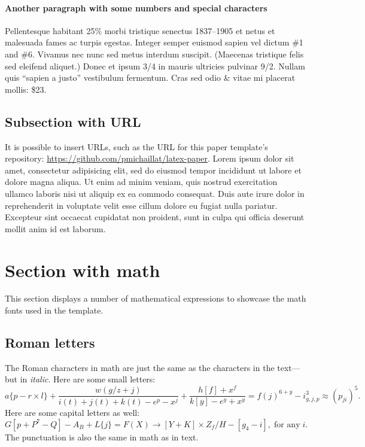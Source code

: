 \documentclass[letterpaper,11pt,leqno]{article}
\begin{document}
\paragraph{Another paragraph with some numbers and special characters} Pellentesque habitant 25\% morbi tristique senectus 1837--1905 et netus et malesuada fames ac turpis egestas. Integer semper euismod sapien vel dictum \#1 and \#6. Vivamus nec nunc sed metus interdum suscipit. (Maecenas tristique felis sed eleifend aliquet.) Donec et ipsum 3/4 in mauris ultricies pulvinar 9/2. Nullam quis ``sapien a justo'' vestibulum fermentum. Cras sed odio \& vitae mi placerat mollis: \$23.

\subsection{Subsection with URL}

It is possible to insert URLs, such as the URL for this paper template's repository: \url{https://github.com/pmichaillat/latex-paper}. Lorem ipsum dolor sit amet, consectetur adipisicing elit, sed do eiusmod tempor incididunt ut labore et dolore magna aliqua. Ut enim ad minim veniam, quis nostrud exercitation ullamco laboris nisi ut aliquip ex ea commodo consequat. Duis aute irure dolor in reprehenderit in voluptate velit esse
cillum dolore eu fugiat nulla pariatur. Excepteur sint occaecat cupidatat non
proident, sunt in culpa qui officia deserunt mollit anim id est laborum.

\section{Section with math}\label{s:math}

This section displays a number of mathematical expressions to showcase the math fonts used in the template.

\subsection{Roman letters} 

The Roman characters in math are just the same as the characters in the text---but in \textit{italic}. Here are some small letters: 
\begin{equation*}
a\{p - r \times l\} + \frac{w(g/z+j)}{i(t)+j(t)+k(t) - e^p - x^j} + \frac{h[f]+x^f}{k[y]-e^y + x^y} = f(j)^{6+y} - i^3_{g,j,p} \approx (p_{ji})^5.
\end{equation*}
Here are some capital letters as well: 
\begin{equation*}
G[p + P^7-Q] - A_B + L\{j\} = F(X) \to [Y+K]\times Z_f/H - [g_4 - i],\;\text{for any}\;i.
\end{equation*}
The punctuation is also the same in math as in text. 
\end{document}
